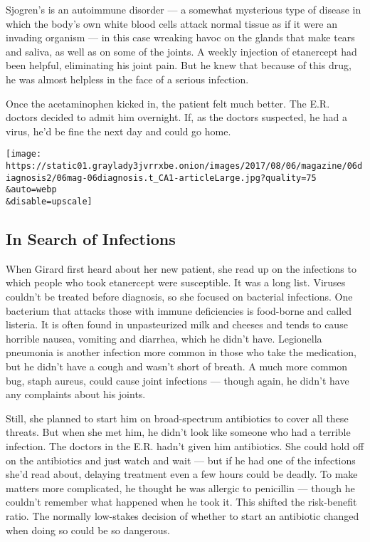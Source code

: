 Sjogren's is an autoimmune disorder --- a somewhat mysterious type of
disease in which the body's own white blood cells attack normal tissue
as if it were an invading organism --- in this case wreaking havoc on
the glands that make tears and saliva, as well as on some of the joints.
A weekly injection of etanercept had been helpful, eliminating his joint
pain. But he knew that because of this drug, he was almost helpless in
the face of a serious infection.

Once the acetaminophen kicked in, the patient felt much better. The E.R.
doctors decided to admit him overnight. If, as the doctors suspected, he
had a virus, he'd be fine the next day and could go home.

\texttt{[image: https://static01.graylady3jvrrxbe.onion/images/2017/08/06/magazine/06diagnosis2/06mag-06diagnosis.t\_CA1-articleLarge.jpg?quality=75\\\&auto=webp\\\&disable=upscale]}

\hypertarget{in-search-of-infections}{%
\subsection{\texorpdfstring{\textbf{In Search of
Infections}}{In Search of Infections}}\label{in-search-of-infections}}

When Girard first heard about her new patient, she read up on the
infections to which people who took etanercept were susceptible. It was
a long list. Viruses couldn't be treated before diagnosis, so she
focused on bacterial infections. One bacterium that attacks those with
immune deficiencies is food-borne and called listeria. It is often found
in unpasteurized milk and cheeses and tends to cause horrible nausea,
vomiting and diarrhea, which he didn't have. Legionella pneumonia is
another infection more common in those who take the medication, but he
didn't have a cough and wasn't short of breath. A much more common bug,
staph aureus, could cause joint infections --- though again, he didn't
have any complaints about his joints.

Still, she planned to start him on broad-spectrum antibiotics to cover
all these threats. But when she met him, he didn't look like someone who
had a terrible infection. The doctors in the E.R. hadn't given him
antibiotics. She could hold off on the antibiotics and just watch and
wait --- but if he had one of the infections she'd read about, delaying
treatment even a few hours could be deadly. To make matters more
complicated, he thought he was allergic to penicillin --- though he
couldn't remember what happened when he took it. This shifted the
risk-benefit ratio. The normally low-stakes decision of whether to start
an antibiotic changed when doing so could be so dangerous.

